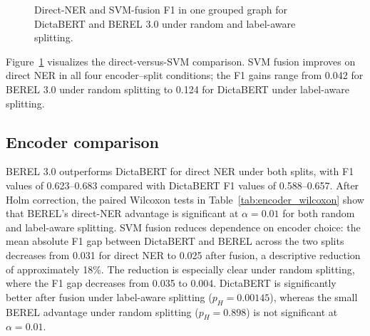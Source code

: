 \documentclass[conference,a4paper]{IEEEtran}
\begin{document}
\begin{figure}[!t]
\centering
{}
\caption{Direct-NER and SVM-fusion F1 in one grouped graph for DictaBERT and BEREL 3.0 under random and label-aware splitting.}
\label{fig:results}
\end{figure}

Figure~\ref{fig:results} visualizes the direct-versus-SVM comparison. SVM fusion improves on direct NER in all four encoder--split conditions; the F1 gains range from 0.042 for BEREL 3.0 under random splitting to 0.124 for DictaBERT under label-aware splitting.

\subsection{Encoder comparison}

BEREL 3.0 outperforms DictaBERT for direct NER under both splits, with F1 values of 0.623--0.683 compared with DictaBERT F1 values of 0.588--0.657. After Holm correction, the paired Wilcoxon tests in Table~\ref{tab:encoder_wilcoxon} show that BEREL's direct-NER advantage is significant at $\alpha=0.01$ for both random and label-aware splitting. SVM fusion reduces dependence on encoder choice: the mean absolute F1 gap between DictaBERT and BEREL across the two splits decreases from 0.031 for direct NER to 0.025 after fusion, a descriptive reduction of approximately 18\%. The reduction is especially clear under random splitting, where the F1 gap decreases from 0.035 to 0.004. DictaBERT is significantly better after fusion under label-aware splitting ($p_H=0.00145$), whereas the small BEREL advantage under random splitting ($p_H=0.898$) is not significant at $\alpha=0.01$.
\end{document}
